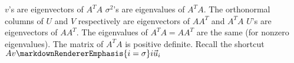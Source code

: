 \markdownRendererInterblockSeparator
{}\markdownRendererUlBegin
\markdownRendererUlItem $v$'s are eigenvectors of $A^TA$\markdownRendererUlItemEnd 
\markdownRendererUlItem $\sigma^2$'s are eigenvalues of $A^TA$.\markdownRendererUlItemEnd 
\markdownRendererUlItem The orthonormal columns of $U$ and $V$ respectively are eigenvectors of $AA^T$ and $A^TA$\markdownRendererUlItemEnd 
\markdownRendererUlItem $U$'s are eigenvectors of $AA^T$.\markdownRendererUlItemEnd 
\markdownRendererUlItem The eigenvalues of $A^TA=AA^T$ are the same (for nonzero eigenvalues).\markdownRendererUlItemEnd 
\markdownRendererUlItem The matrix of $A^TA$ is positive definite.\markdownRendererUlItemEnd 
\markdownRendererUlEnd \markdownRendererInterblockSeparator
{}Recall the shortcut $Av\markdownRendererEmphasis{i=\sigma}i \vec{u}_i$\relax